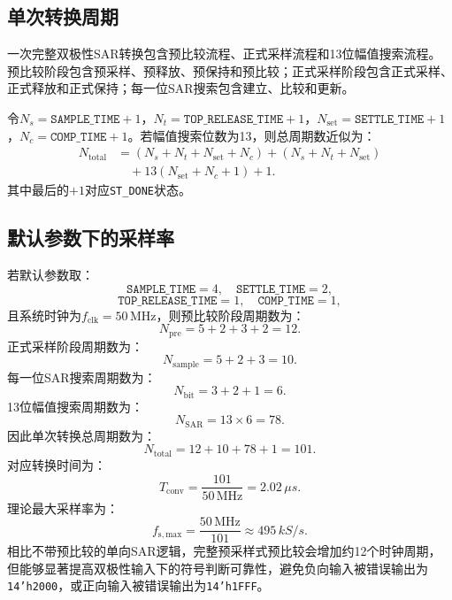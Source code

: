 \subsection{单次转换周期}

一次完整双极性SAR转换包含预比较流程、正式采样流程和13位幅值搜索流程。预比较阶段包含预采样、预释放、预保持和预比较；正式采样阶段包含正式采样、正式释放和正式保持；每一位SAR搜索包含建立、比较和更新。

令$N_s=\texttt{SAMPLE\_TIME}+1$，$N_t=\texttt{TOP\_RELEASE\_TIME}+1$，$N_{\mathrm{set}}=\texttt{SETTLE\_TIME}+1$，$N_c=\texttt{COMP\_TIME}+1$。若幅值搜索位数为13，则总周期数近似为：
\begin{equation}
\begin{aligned}
N_{\mathrm{total}}
&= (N_s+N_t+N_{\mathrm{set}}+N_c)
 +(N_s+N_t+N_{\mathrm{set}})\\
&\quad +13\left(N_{\mathrm{set}}+N_c+1\right)+1.
\end{aligned}
\end{equation}
其中最后的$+1$对应\texttt{ST\_DONE}状态。

\subsection{默认参数下的采样率}

若默认参数取：
\begin{equation}
    \texttt{SAMPLE\_TIME}=4,\quad \texttt{SETTLE\_TIME}=2,
\end{equation}
\begin{equation}
    \texttt{TOP\_RELEASE\_TIME}=1,\quad \texttt{COMP\_TIME}=1,
\end{equation}
且系统时钟为$f_{\mathrm{clk}}=50\,\mathrm{MHz}$，则预比较阶段周期数为：
\begin{equation}
    N_{\mathrm{pre}} = 5 + 2 + 3 + 2 = 12.
\end{equation}
正式采样阶段周期数为：
\begin{equation}
    N_{\mathrm{sample}} = 5 + 2 + 3 = 10.
\end{equation}
每一位SAR搜索周期数为：
\begin{equation}
    N_{\mathrm{bit}} = 3 + 2 + 1 = 6.
\end{equation}
13位幅值搜索周期数为：
\begin{equation}
    N_{\mathrm{SAR}} = 13 \times 6 = 78.
\end{equation}
因此单次转换总周期数为：
\begin{equation}
    N_{\mathrm{total}} = 12 + 10 + 78 + 1 = 101.
\end{equation}
对应转换时间为：
\begin{equation}
    T_{\mathrm{conv}} =
    \frac{101}{50\,\mathrm{MHz}}
    = 2.02\,\mu s.
\end{equation}
理论最大采样率为：
\begin{equation}
    f_{\mathrm{s,max}} =
    \frac{50\,\mathrm{MHz}}{101}
    \approx 495\,kS/s.
\end{equation}
相比不带预比较的单向SAR逻辑，完整预采样式预比较会增加约12个时钟周期，但能够显著提高双极性输入下的符号判断可靠性，避免负向输入被错误输出为\texttt{14'h2000}，或正向输入被错误输出为\texttt{14'h1FFF}。

